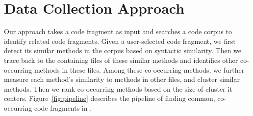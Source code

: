 \section{Data Collection Approach}
\label{sec:approach}
Our approach takes a code fragment as input and searches a code corpus to identify related code fragments. Given a user-selected code fragment, we first detect its similar methods in the corpus based on syntactic similarity. Then we trace back to the containing files of these similar methods and identifies other co-occurring methods in these files. Among these co-occurring methods, we further measure each method's similarity to methods in other files, and cluster similar methods. Then we rank co-occurring methods based on the size of cluster it centers. Figure~\ref{fig:pipeline} describes the pipeline of finding common, co-occurring code fragments in {\tool}. 


